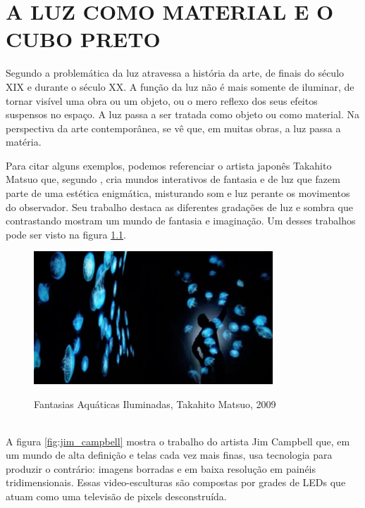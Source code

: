 \chapter{A LUZ COMO MATERIAL E O CUBO PRETO}

Segundo  a problemática da luz atravessa a história da arte, de finais do século XIX e durante o século XX. A função da luz não é mais somente de iluminar, de tornar visível uma obra ou um objeto, ou o mero reflexo dos seus efeitos suspensos no espaço. A luz passa a ser tratada como objeto ou como material. Na perspectiva da arte contemporânea, se vê que, em muitas obras, a luz passa a matéria. 

Para citar alguns exemplos, podemos referenciar o artista japonês Takahito Matsuo que, segundo , cria mundos interativos de fantasia e de luz que fazem parte de uma estética enigmática, misturando som e luz perante os movimentos do observador. Seu trabalho destaca as diferentes gradações de luz e sombra que contrastando mostram um mundo de fantasia e imaginação. Um desses trabalhos pode ser visto na figura \ref{fig:takahito_matsuo}.

\begin{figure}[H]
    \centering
    \caption{Fantasias Aquáticas Iluminadas, Takahito Matsuo, 2009}
	\vspace*{0,2cm}
    \includegraphics[width=0.8\textwidth]{./04-figuras/takahito_matsuo}
    \label{fig:takahito_matsuo}
\end{figure}
\vspace*{-0,9cm}
{\raggedright {}}\\

A figura \ref{fig:jim_campbell} mostra o trabalho do artista Jim Campbell que, em um mundo de alta definição e telas cada vez mais finas, usa tecnologia para produzir o contrário: imagens borradas e em baixa resolução em painéis tridimensionais. Essas video-esculturas são compostas por grades de LEDs que atuam como uma televisão de pixels desconstruída. 

